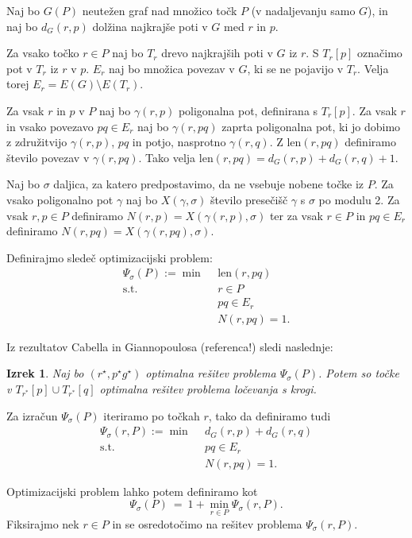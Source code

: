 \documentclass[a4paper, 12pt]{book}
\def\length{\mathrm{len}}
\newtheorem{izrek}{Izrek}[chapter]
\begin{document}
Naj bo $G(P)$ neutežen graf nad množico točk $P$ (v nadaljevanju samo $G$), in naj bo $d_G(r,p)$ dolžina najkrajše poti v $G$ med $r$ in $p$.

Za vsako točko $r\in P$ naj bo $T_r$ drevo najkrajših poti v $G$ iz $r$. S $T_r[p]$ označimo pot v $T_r$ iz $r$ v $p$. $E_r$ naj bo množica povezav v $G$, ki se ne pojavijo v $T_r$. Velja torej $E_r = E(G)\setminus E(T_r)$.

Za vsak $r$ in $p$ v $P$ naj bo $\gamma(r,p)$ poligonalna pot, definirana s $T_r[p]$. Za vsak $r$ in vsako povezavo $pq\in E_r$ naj bo $\gamma (r,pq)$ zaprta poligonalna pot, ki jo dobimo z združitvijo $\gamma(r,p)$, $pq$ in  potjo, nasprotno $\gamma(r,q)$. Z $\length(r,pq)$ definiramo število povezav v $\gamma(r,pq)$. Tako velja $\length(r,pq) = d_G(r,p) + d_G(r,q) + 1$.

Naj bo $\sigma$ daljica, za katero predpostavimo, da ne vsebuje nobene točke iz $P$. Za vsako poligonalno pot $\gamma$ naj bo $X(\gamma, \sigma)$ število presečišč $\gamma$ s $\sigma$ po modulu 2. Za vsak $r,p\in P$ definiramo $N(r,p) = X(\gamma(r,p), \sigma)$ ter za vsak $r\in P$ in $pq\in E_r$ definiramo $N(r,pq) = X(\gamma(r,pq), \sigma)$.

Definirajmo sledeč optimizacijski problem:
\begin{align*}
	\Psi_\sigma(P) := \min ~~& \length(r,pq)\\
	 \mbox{s.t.}~~ & r\in P\\
				&	pq\in E_r\\
				&	N(r,pq)=1. 
\end{align*}

Iz rezultatov Cabella in Giannopoulosa (referenca!) sledi naslednje:

\begin{izrek}
Naj bo $(r^\star, p^\star g^\star)$ optimalna rešitev problema $\Psi_\sigma(P)$. Potem so točke v $T_{r^*}[p]\cup T_{r^*}[q]$ optimalna rešitev problema ločevanja s krogi. 
\end{izrek}

Za izračun $\Psi_\sigma(P)$ iteriramo po točkah $r$, tako da definiramo tudi
\begin{align*}
	\Psi_\sigma(r,P) := \min ~~& d_G(r,p)+d_G(r,q) \\
	 \mbox{s.t.}~~ & pq\in E_r\\
				&	N(r,pq)=1. 
\end{align*}

Optimizacijski problem lahko potem definiramo kot
\[
	\Psi_\sigma(P) ~=~ 1+ \min_{r\in P} \Psi_\sigma(r,P).
\]
Fiksirajmo nek $r\in P$ in se osredotočimo na rešitev problema $\Psi_\sigma(r,P)$.
\end{document}
